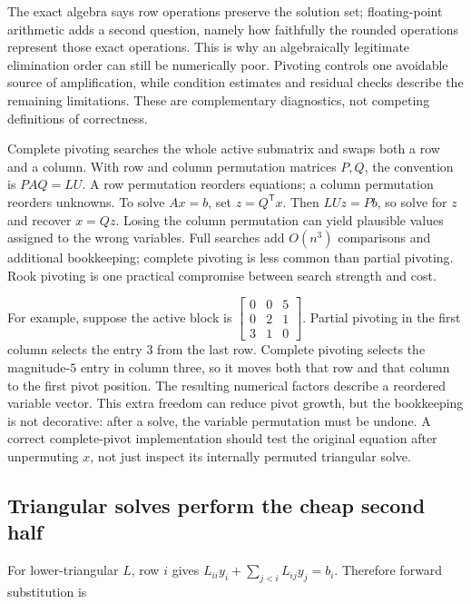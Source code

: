 The exact algebra says row operations preserve the solution set; floating-point arithmetic adds a second question, namely how faithfully the rounded operations represent those exact operations. This is why an algebraically legitimate elimination order can still be numerically poor. Pivoting controls one avoidable source of amplification, while condition estimates and residual checks describe the remaining limitations. These are complementary diagnostics, not competing definitions of correctness.

Complete pivoting searches the whole active submatrix and swaps both a row and a column. With row and column permutation matrices \(P,Q\), the convention is \(PAQ=LU\). A row permutation reorders equations; a column permutation reorders unknowns. To solve \(Ax=b\), set \(z=Q^\mathsf T x\). Then \(LUz=Pb\), so solve for \(z\) and recover \(x=Qz\). Losing the column permutation can yield plausible values assigned to the wrong variables. Full searches add \(O(n^3)\) comparisons and additional bookkeeping; complete pivoting is less common than partial pivoting. Rook pivoting is one practical compromise between search strength and cost.

For example, suppose the active block is \(\begin{bmatrix}0&0&5\\0&2&1\\3&1&0\end{bmatrix}\). Partial pivoting in the first column selects the entry \(3\) from the last row. Complete pivoting selects the magnitude-\(5\) entry in column three, so it moves both that row and that column to the first pivot position. The resulting numerical factors describe a reordered variable vector. This extra freedom can reduce pivot growth, but the bookkeeping is not decorative: after a solve, the variable permutation must be undone. A correct complete-pivot implementation should test the original equation after unpermuting \(x\), not just inspect its internally permuted triangular solve.

\subsection{Triangular solves perform the cheap second half}\label{01-foundations-i-ch019-triangular-solves-perform-the-cheap-second-half}

\hypertarget{01-foundations-i-ch019-triangular-solves-perform-the-cheap-second-half}{}

For lower-triangular \(L\), row \(i\) gives \(L_{ii}y_i+\sum_{j<i}L_{ij}y_j=b_i\). Therefore forward substitution is

